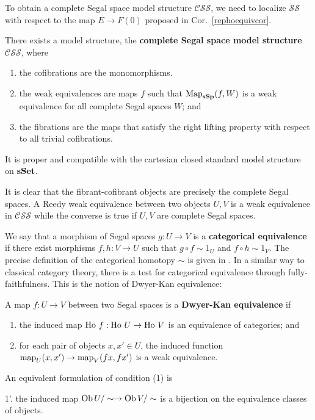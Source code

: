 \begin{refsection}
To obtain a complete Segal space model structure $\mathcal{CSS}$, we need to localize $\mathcal{SS}$ with respect to the map $E\to F(0)$ proposed in Cor.~\ref{rephoequivcor}.
\begin{thm}
There exists a model structure, the \textbf{complete Segal space model structure} $\mathcal{CSS}$, where
\begin{enumerate}
\item the cofibrations are the monomorphisms.
\item the weak equivalences are maps $f$ such that $\operatorname{\mathrm{Map}}_{\mathbf{sSp}}(f,W)$ is a weak equivalence for all complete Segal spaces $W$; and
\item the fibrations are the maps that satisfy the right lifting property with respect to all trivial cofibrations.
\end{enumerate}
It is proper and compatible with the cartesian closed standard model structure on $\mathbf{sSet}$.
\end{thm}
It is clear that the fibrant-cofibrant objects are precisely the complete Segal spaces. A Reedy weak equivalence between two objects $U,V$ is a weak equivalence in $\mathcal{CSS}$ while the converse is true if $U,V$ are complete Segal spaces.

We say that a morphism of Segal spaces $g:U\to V$ is a \textbf{categorical equivalence} if there exist morphisms $f,h:V\to U$ such that $g\circ f\sim 1_U$ and $f\circ h\sim 1_V$. The precise definition of the categorical homotopy $\sim$ is given in \cite[Sec.~13.1]{rezk-a-model-for-the-homotopy-theory-of-homotopy-theories}. In a similar way to classical category theory, there is a test for categorical equivalence through fully-faithfulness. This is the notion of Dwyer-Kan equivalence:
\begin{defin}
A map $f:U\to V$ between two Segal spaces is a \textbf{Dwyer-Kan equivalence} if
\begin{enumerate}
\item the induced map $\operatorname{\mathrm{Ho} \,} f:\operatorname{\mathrm{Ho} \,} U\to\operatorname{\mathrm{Ho} \,} V$ is an equivalence of categories; and
\item for each pair of objects $x,x'\in U$, the induced function $\operatorname{\mathrm{map}}_U(x,x')\to\operatorname{\mathrm{map}}_V(fx,fx')$ is a weak equivalence.
\end{enumerate}
An equivalent formulation of condition (1) is
\begin{description}
\item{1'.} the induced map $\operatorname{Ob} U/\sim\to\operatorname{Ob} V/\sim$ is a bijection on the equivalence classes of objects.
\end{description}
\end{defin}


\end{refsection}

